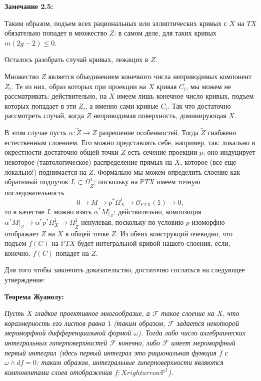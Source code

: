 \medskip
{\bf Замечание 2.5:}

Таким образом, подъем всех рациональных или эллиптических
кривых с $X$ на $TX$ обязательно попадет в множество $Z$: в самом
деле,
для таких кривых $m(2g-2)\leq 0$.

\medskip
Осталось разобрать случай кривых, лежащих в $Z$.

Множество $Z$ является объединением конечного числа неприводимых компонент $Z_i$.
Те из них, образ которых при проекции на $X$ кривая $C_i$, мы можем не
рассматривать: действительно, на  $X$ имеем лишь конечное число
кривых, подъем которых попадает в эти $Z_i$, а именно сами кривые $C_i$.
Так что достаточно рассмотреть случай, когда $Z$ неприводимая поверхность,
доминирующая $X$.

В этом случае пусть $\alpha\colon\tilde{Z}\rightarrow Z$  разрешение
 особенностей.
Тогда $\tilde{Z}$
снабжено
естественным слоением. Его можно представлять себе, например, так: локально
в окрестности достаточно общей точки
$Z$ есть сечение проекции $p$;
оно индуцирует некоторое (тавтологическое) распределение прямых на $X$,
которое (все еще локально!) поднимается на $Z$. Формально мы можем
определить слоение как обратимый подпучок
$L\subset\Omega^1_{\tilde{Z}}$; поскольку на ${\mathbb{P} TX}$ имеем точную
последовательность
$$
0\rightarrow M\rightarrow p^*\Omega_X^1\rightarrow \mathcal{O}_{\mathbb{P} TX}(1)\rightarrow 0,
$$
то в качестве $L$ можно взять $\alpha^*M|_Z$: действительно, композиция
$\alpha^*M|_Z\rightarrow \alpha^*p^*\Omega_X^1\rightarrow \Omega_{\tilde{Z}}^1$
ненулевая, поскольку по условию $p$ изоморфно отображает $Z$ на $X$ в общей
точке $Z$. Из обеих конструкций очевидно, что подъем $f(C)$ на ${\mathbb{P} TX}$
будет интегральной кривой нашего слоения, если, конечно, $f(C)$ попадет
на $Z$.

Для того чтобы закончить доказательство, достаточно сослаться
на следующее утверждение:


\medskip
{\bf Теорема Жуанолу:}
	\begin{theorem}
		{\it
			Пусть $X$ гладкое проективное многообразие,
			а $\mathcal{F}$ такое слоение на $X$, что коразмерность его листов равна $1$
			\textup(таким образом, $\mathcal{F}$
			задается некоторой мероморфной дифференциальной формой $\omega$\textup). Тогда либо
			число алгебраических интегральных гиперповерхностей $\mathcal{F}$ конечно, либо $\mathcal{F}$
			имеет мероморфный первый интеграл \textup(здесь \emph{первый интеграл} это
			рациональная функция $f$ с $\omega\wedge df=0$; таким образом, интегральные
			гиперповерхности являются компонентами слоев отображения
			$f\colon Xrightarrow\mathbb{P}^1$\textup).
		}
	\end{theorem}

